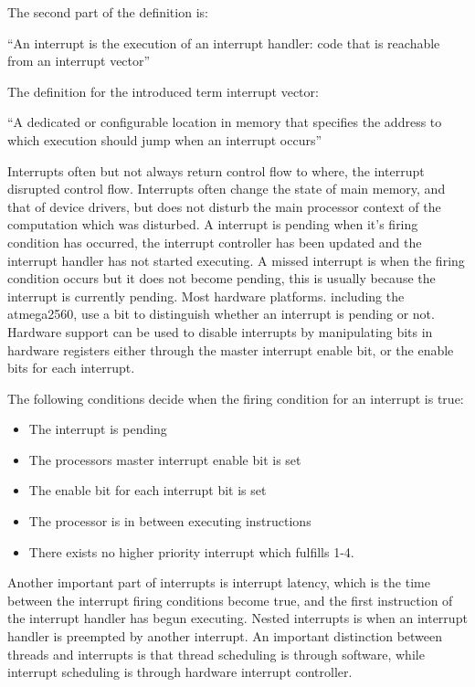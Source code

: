 The second part of the definition is:

{\addtolength{\leftskip}{10 mm}
	\enquote{An interrupt is the execution of an interrupt handler: code that is reachable from an interrupt vector}
	
}

The definition for the introduced term interrupt vector:

{\addtolength{\leftskip}{10 mm}
	\enquote{A dedicated or configurable location in memory that specifies the address to which execution should jump when an interrupt occurs}
	
}

Interrupts often but not always return control flow to where, the interrupt disrupted control flow\citep{safe}. Interrupts often change the state of main memory, and that of device drivers, but does not disturb the main processor context of the computation which was disturbed.\newline
A interrupt is pending when it's firing condition has occurred, the interrupt controller has been updated and the interrupt handler has not started executing. A missed interrupt is when the firing condition occurs but it does not become pending, this is usually because the interrupt is currently pending\citep{safe}. Most hardware platforms. including the atmega2560, use a bit to distinguish whether an interrupt is pending or not. Hardware support can be used to disable interrupts by manipulating bits in hardware registers either through the master interrupt enable bit, or the enable bits for each interrupt. 

The following conditions decide when the firing condition for an interrupt is true:

\begin{itemize}
	\item The interrupt is pending
	\item The processors master interrupt enable bit is set
	\item The enable bit for each interrupt bit is set
	\item The processor is in between executing instructions
	\item There exists no higher priority interrupt which fulfills 1-4.
\end{itemize}

Another important part of interrupts is interrupt latency, which is the time between the interrupt firing conditions become true, and the first instruction of the interrupt handler has begun executing. Nested interrupts is when an interrupt handler is preempted by another interrupt. An important distinction between threads and interrupts is that thread scheduling is through software, while interrupt scheduling is through hardware interrupt controller\citep{safe}.

